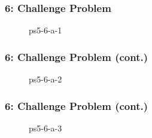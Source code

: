 \documentclass[../report.tex]{subfiles}
\begin{document}
    
    \begin{frame}
        \frametitle{6: Challenge Problem}
        \begin{figure}[!htb]
            \centering
            \caption{ps5-6-a-1}
        \end{figure}
    \end{frame}

    \begin{frame}
        \frametitle{6: Challenge Problem (cont.)}
        \begin{figure}[!htb]
            \centering
            \caption{ps5-6-a-2}
        \end{figure}
    \end{frame}

    \begin{frame}
        \frametitle{6: Challenge Problem (cont.)}
        \begin{figure}[!htb]
            \centering
            \caption{ps5-6-a-3}
        \end{figure}
    \end{frame}
\end{document}
